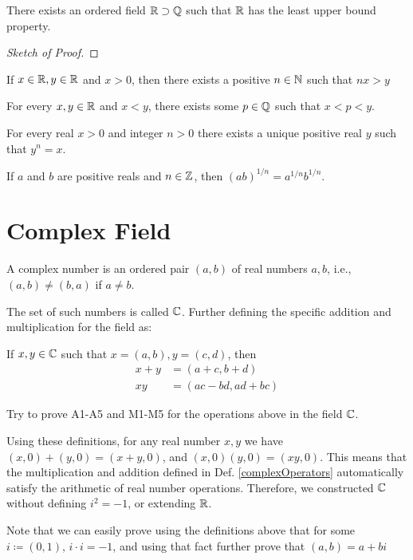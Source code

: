 \begin{theorem}
There exists an ordered field $\mathbb{R} \supset \mathbb{Q}$ such that $\mathbb{R}$ has the least upper bound property.
\end{theorem}
\begin{proof}[Sketch of Proof]

\end{proof}

\begin{theorem}
If $x\in\mathbb{R}, y\in\mathbb{R}$ and $x>0$, then there exists a positive $n\in\mathbb{N}$ such that $nx>y$
\end{theorem}
\begin{corollary}
For every $x,y\in\mathbb{R}$ and $x<y$, there exists some $p\in\mathbb{Q}$ such that $x<p<y$.
\end{corollary}

\begin{theorem}
For every real $x>0$ and integer $n>0$ there exists a unique positive real $y$ such that $y^n=x$.
\end{theorem}
\begin{corollary}
If $a$ and $b$ are positive reals and $n\in\mathbb{Z}$, then $(ab)^{1/n} = a^{1/n}b^{1/n}$.
\end{corollary}

\section{Complex Field}
\begin{definition}
A complex number is an ordered pair  $(a,b)$ of real numbers $a,b$, i.e., $(a,b)\neq(b,a)$ if $a\neq b$.
\end{definition}
The set of such numbers is called $\mathbb{C}$. Further defining the specific addition and multiplication for the field as:
\begin{definition}\label{complexOperators}
If $x,y\in\mathbb{C}$ such that $x=(a,b),y=(c,d)$, then
\begin{equation*}
\begin{split}
x+y &= (a+c,b+d)\\
xy &= (ac-bd,ad+bc)
\end{split}    
\end{equation*}
\end{definition}

Try to prove A1-A5 and M1-M5 for the operations above in the field $\mathbb{C}$.

Using these definitions, for any real number $x,y$ we have $(x,0)+(y,0)=(x+y,0)$, and $(x,0)(y,0)=(xy,0)$. This means that the multiplication and addition defined in Def. \ref{complexOperators} automatically satisfy the arithmetic of real number operations. Therefore, we constructed $\mathbb{C}$ without defining $i^2=-1$, or extending $\mathbb{R}$.\\
\begin{remark}
Note that we can easily prove using the definitions above that for some $i\coloneqq (0,1)$, $i\cdot i=-1$, and using that fact further prove that $(a,b)=a+bi$
\end{remark}

